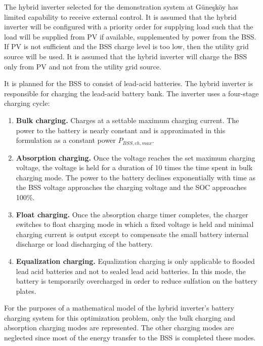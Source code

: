 The hybrid inverter selected for the demonstration system at Güneşköy has limited capability to receive external control. It is assumed that the hybrid inverter will be configured with a priority order for supplying load such that the load will be supplied from PV if available, supplemented by power from the BSS. If PV is not sufficient and the BSS charge level is too low, then the utility grid source will be used. It is assumed that the hybrid inverter will charge the BSS only from PV and not from the utility grid source.

It is planned for the BSS to consist of lead-acid batteries. The hybrid inverter is responsible for charging the lead-acid battery bank. The inverter uses a four-stage charging cycle\cite{Growatt_manual}:

\begin{enumerate}
	\item \textbf{Bulk charging.} Charges at a settable maximum charging current. The power to the battery is nearly constant and is approximated in this formulation as a constant power $P_{BSS,ch,max}$.
	\item \textbf{Absorption charging.} Once the voltage reaches the set maximum charging voltage, the voltage is held for a duration of 10 times the time spent in bulk charging mode. The power to the battery declines exponentially with time as the BSS voltage approaches the charging voltage and the SOC approaches 100\%.
	\item \textbf{Float charging.} Once the absorption charge timer completes, the charger switches to float charging mode in which a fixed voltage is held and minimal charging current is output except to compensate the small battery internal discharge or load discharging of the battery.
	\item \textbf{Equalization charging.} Equalization charging is only applicable to flooded lead acid batteries and not to sealed lead acid batteries. In this mode, the battery is temporarily overcharged in order to reduce sulfation on the battery plates.
\end{enumerate}

For the purposes of a mathematical model of the hybrid inverter's battery charging system for this optimization problem, only the bulk charging and absorption charging modes are represented. The other charging modes are neglected since most of the energy transfer to the BSS is completed these modes.

